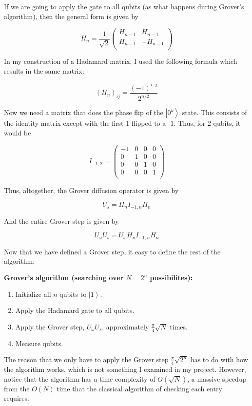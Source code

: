 \documentclass[11pt]{article}
\begin{document}
If we are going to apply the gate to all qubits (as what happens during Grover's algorithm), then the general form is given by

$$H_{n}=\frac{1}{\sqrt{2}}\begin{pmatrix}
H_{n-1} & H_{n-1} \\
H_{n-1} & -H_{n-1} \\
\end{pmatrix}$$

In my construction of a Hadamard matrix, I used the following formula which results in the same matrix:

$$(H_{n})_{ij}= \frac{(-1)^{i\cdot j}}{2^{n/2}} $$

Now we need a matrix that does the phase flip of the $\left | 0^k \right \rangle$ state. This consists of the identity matrix except with the first 1 flipped to a -1. Thus, for 2 qubits, it would be

$$I_{-1,2}=\begin{pmatrix}
-1 & 0 & 0 & 0 \\
0 & 1 & 0 & 0 \\
0 & 0 & 1 & 0 \\
0 & 0 & 0 & 1 \\
\end{pmatrix}$$

Thus, altogether, the Grover diffusion operator is given by

$$U_{s}=H_{n} I_{-1,n} H_{n}$$

And the entire Grover step is given by

$$U_{\omega} U_{s} = U_{\omega} H_{n} I_{-1,n} H_{n}$$

Now that we have defined a Grover step, it easy to define the rest of the algorithm:

\begin{framed}
\textbf{Grover's algorithm (searching over $N=2^{n}$ possibilites):}
\begin{enumerate}
	\item Initialize all $n$ qubits to $\left | 1 \right \rangle$.
	\item Apply the Hadamard gate to all qubits.
	\item Apply the Grover step, $U_{\omega} U_{s}$, approximately $\frac{\pi}{4} \sqrt{N}$ times.
	\item Measure qubits.
\end{enumerate}
\end{framed}

The reason that we only have to apply the Grover step $\frac{\pi}{4} \sqrt{2^{n}}$ has to do with how the algorithm works, which is not something I examined in my project. However, notice that the algorithm has a time complexity of $O(\sqrt{N})$, a massive speedup from the $O(N)$ time that the classical algorithm of checking each entry requires.
\end{document}
